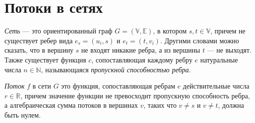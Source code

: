 \documentclass[russian]{lecture-notes}
\newenvironment{centeredgraph}[3]
{
	\begin{center}
		\begin{tikzpicture}[every node/.style={#1}, every edge/.style={#2}, every path/.style={#3}]
	}
	{
		\end{tikzpicture}
	\end{center}
}
\begin{document}
	\section{Потоки в сетях}
	\begin{definition}
		\textit{Сеть} --- это ориентированный граф $G = (\mathbb{V}, \mathbb{E})$, в котором $s,t \in \mathbb{V}$, причем не существует ребер вида $e_s = (u_i, s)$ и $e_t = (t, v_i)$. Другими словами можно сказать, что в вершину $s$ не входят никакие ребра, а из вершины $t$ --- не выходят. Также существует функция $c$, сопоставляющая каждому ребру $e$ натуральные числа $n \in \mathbb{N}$, называющаяся \textit{пропускной способностью ребра}.
	\end{definition}
	\begin{definition}
		\textit{Поток} $f$ в сети $G$ это функция, сопоставляющая ребрам $e$ действительные числа $r \in \mathbb{R}$, причем значение функции не превосходит пропускную способность ребра, а алгебраическая сумма потоков в вершинах $v$, таких что $v \neq s$ и $v \neq t$, должна быть нулем.		
	\end{definition}
	
\end{document}
